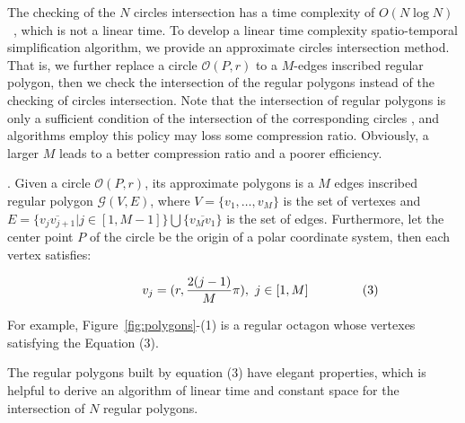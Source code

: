 The checking of the $N$ circles intersection has a time complexity of \textcolor[rgb]{1.00,0.00,0.00}{${O(N\log N)}$~\cite{Shamos:Circle}}, which is not a linear time.
To develop a linear time complexity spatio-temporal simplification algorithm, we provide an approximate circles intersection method.
That is, we further replace a circle $\mathcal{O}(P, r)$ to a $M$-edges inscribed regular polygon,
then we check the intersection of the regular polygons instead of the checking of circles intersection.
Note that the intersection of regular polygons is only a sufficient condition of the intersection of the corresponding circles , and
algorithms employ this policy may loss some compression ratio. Obviously, a larger $M$ leads to a better compression ratio and a poorer
efficiency.

.
Given a circle $\mathcal{O}(P, r)$, its approximate polygons is a $M$ edges inscribed regular polygon $\mathcal{G}(V, E)$,
where $V=\{v_1, \ldots, v_{M}\}$ is the set of vertexes and
$E= \{\overline{v_jv_{j+1}}| j\in [1,M-1]\} \bigcup \{\overline{v_Mv_1}\}$ is the set of edges.
Furthermore, let the center point $P$ of the circle be the origin of a polar coordinate system, then each vertex satisfies:

\vspace{-2ex}
\begin{equation*}
\label{equ-regular-polygon}
    \begin{aligned}
        \hspace{10ex}  v_j = (r, \frac{2(j-1)}{M}\pi), ~j \in [1, M]    \hspace{10ex} (3)\\
    \end{aligned}
\end{equation*}
\vspace{-1ex}


For example, Figure~\ref{fig:polygons}-(1) is a regular octagon whose vertexes satisfying the Equation (3).

The regular polygons built by equation (3) have elegant properties, which is helpful to derive an algorithm of linear time and constant space
for the intersection of $N$ regular polygons.


